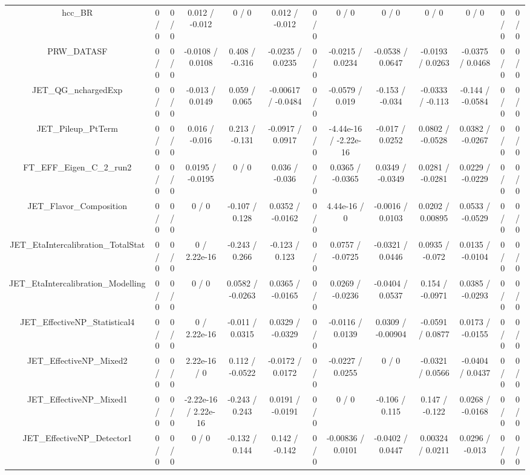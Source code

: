 \documentclass[10pt]{article}
\begin{document}
\begin{table}[htbp]
\begin{center}
\begin{tabular}{|c|c|c|c|c|c|c|c|c|c|c|c|c|}
  hcc_BR & 0 / 0 & 0 / 0 & 0.012 / -0.012 & 0 / 0 & 0.012 / -0.012 & 0 / 0 & 0 / 0 & 0 / 0 & 0 / 0 & 0 / 0 & 0 / 0 & 0 / 0 \\ 
  PRW_DATASF & 0 / 0 & 0 / 0 & -0.0108 / 0.0108 & 0.408 / -0.316 & -0.0235 / 0.0235 & 0 / 0 & -0.0215 / 0.0234 & -0.0538 / 0.0647 & -0.0193 / 0.0263 & -0.0375 / 0.0468 & 0 / 0 & 0 / 0 \\ 
  JET_QG_nchargedExp & 0 / 0 & 0 / 0 & -0.013 / 0.0149 & 0.059 / 0.065 & -0.00617 / -0.0484 & 0 / 0 & -0.0579 / 0.019 & -0.153 / -0.034 & -0.0333 / -0.113 & -0.144 / -0.0584 & 0 / 0 & 0 / 0 \\ 
  JET_Pileup_PtTerm & 0 / 0 & 0 / 0 & 0.016 / -0.016 & 0.213 / -0.131 & -0.0917 / 0.0917 & 0 / 0 & -4.44e-16 / -2.22e-16 & -0.017 / 0.0252 & 0.0802 / -0.0528 & 0.0382 / -0.0267 & 0 / 0 & 0 / 0 \\ 
  FT_EFF_Eigen_C_2_run2 & 0 / 0 & 0 / 0 & 0.0195 / -0.0195 & 0 / 0 & 0.036 / -0.036 & 0 / 0 & 0.0365 / -0.0365 & 0.0349 / -0.0349 & 0.0281 / -0.0281 & 0.0229 / -0.0229 & 0 / 0 & 0 / 0 \\ 
  JET_Flavor_Composition & 0 / 0 & 0 / 0 & 0 / 0 & -0.107 / 0.128 & 0.0352 / -0.0162 & 0 / 0 & 4.44e-16 / 0 & -0.0016 / 0.0103 & 0.0202 / 0.00895 & 0.0533 / -0.0529 & 0 / 0 & 0 / 0 \\ 
  JET_EtaIntercalibration_TotalStat & 0 / 0 & 0 / 0 & 0 / 2.22e-16 & -0.243 / 0.266 & -0.123 / 0.123 & 0 / 0 & 0.0757 / -0.0725 & -0.0321 / 0.0446 & 0.0935 / -0.072 & 0.0135 / -0.0104 & 0 / 0 & 0 / 0 \\ 
  JET_EtaIntercalibration_Modelling & 0 / 0 & 0 / 0 & 0 / 0 & 0.0582 / -0.0263 & 0.0365 / -0.0165 & 0 / 0 & 0.0269 / -0.0236 & -0.0404 / 0.0537 & 0.154 / -0.0971 & 0.0385 / -0.0293 & 0 / 0 & 0 / 0 \\ 
  JET_EffectiveNP_Statistical4 & 0 / 0 & 0 / 0 & 0 / 2.22e-16 & -0.011 / 0.0315 & 0.0329 / -0.0329 & 0 / 0 & -0.0116 / 0.0139 & 0.0309 / -0.00904 & -0.0591 / 0.0877 & 0.0173 / -0.0155 & 0 / 0 & 0 / 0 \\ 
  JET_EffectiveNP_Mixed2 & 0 / 0 & 0 / 0 & 2.22e-16 / 0 & 0.112 / -0.0522 & -0.0172 / 0.0172 & 0 / 0 & -0.0227 / 0.0255 & 0 / 0 & -0.0321 / 0.0566 & -0.0404 / 0.0437 & 0 / 0 & 0 / 0 \\ 
  JET_EffectiveNP_Mixed1 & 0 / 0 & 0 / 0 & -2.22e-16 / 2.22e-16 & -0.243 / 0.243 & 0.0191 / -0.0191 & 0 / 0 & 0 / 0 & -0.106 / 0.115 & 0.147 / -0.122 & 0.0268 / -0.0168 & 0 / 0 & 0 / 0 \\ 
  JET_EffectiveNP_Detector1 & 0 / 0 & 0 / 0 & 0 / 0 & -0.132 / 0.144 & 0.142 / -0.142 & 0 / 0 & -0.00836 / 0.0101 & -0.0402 / 0.0447 & 0.00324 / 0.0211 & 0.0296 / -0.013 & 0 / 0 & 0 / 0 \\ 

\end{tabular}
\end{center}
\end{table}
\end{document}
